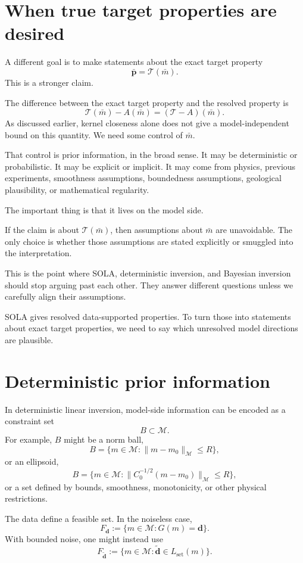 \documentclass[11pt,openany]{book}
\theoremstyle{definition}
\theoremstyle{remark}
\newcommand{\M}{\mathcal M}
\newcommand{\Tau}{\mathcal{T}}
\begin{document}
\section{When true target properties are desired}

A different goal is to make statements about the exact target property
\[
  \bar{\mathbf p}
  =
  \Tau(\bar m).
\]
This is a stronger claim.

The difference between the exact target property and the resolved property is
\[
  \Tau(\bar m)-A(\bar m)
  =
  (\Tau-A)(\bar m).
\]
As discussed earlier, kernel closeness alone does not give a model-independent bound on this
quantity. We need some control of \(\bar m\).

That control is prior information, in the broad sense. It may be deterministic or probabilistic.
It may be explicit or implicit. It may come from physics, previous experiments, smoothness
assumptions, boundedness assumptions, geological plausibility, or mathematical regularity.

The important thing is that it lives on the model side.

\begin{warningbox}
If the claim is about \(\Tau(\bar m)\), then assumptions about \(\bar m\) are unavoidable. The
only choice is whether those assumptions are stated explicitly or smuggled into the
interpretation.
\end{warningbox}

This is the point where SOLA, deterministic inversion, and Bayesian inversion should stop
arguing past each other. They answer different questions unless we carefully align their
assumptions.

SOLA gives resolved data-supported properties. To turn those into statements about exact target
properties, we need to say which unresolved model directions are plausible.

\section{Deterministic prior information}

In deterministic linear inversion, model-side information can be encoded as a constraint set
\[
  B\subset\M.
\]
For example, \(B\) might be a norm ball,
\[
  B=\{m\in\M:\|m-m_0\|_{\M}\le R\},
\]
or an ellipsoid,
\[
  B=\{m\in\M:\|C_0^{-1/2}(m-m_0)\|_{\M}\le R\},
\]
or a set defined by bounds, smoothness, monotonicity, or other physical restrictions.

The data define a feasible set. In the noiseless case,
\[
  F_{\mathbf d}
  :=
  \{m\in\M:G(m)=\mathbf d\}.
\]
With bounded noise, one might instead use
\[
  F_{\widetilde{\mathbf d}}
  :=
  \{m\in\M:\widetilde{\mathbf d}\in L_{\mathrm{set}}(m)\}.
\]
\end{document}
